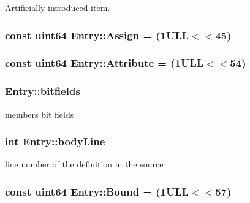 Artificially introduced item. 

\hypertarget{class_entry_a693e96b217885eef90ebcb231fbebf79}{}
\subsubsection[{Assign}]{\setlength{\rightskip}{0pt plus 5cm}const {\bf uint64} Entry\+::\+Assign = (1\+U\+L\+L$<$$<$45)\hspace{0.3cm}{\ttfamily [static]}}\label{class_entry_a693e96b217885eef90ebcb231fbebf79}
\hypertarget{class_entry_a58fb43e4c3a836419285bdcc29302a80}{}
\subsubsection[{Attribute}]{\setlength{\rightskip}{0pt plus 5cm}const {\bf uint64} Entry\+::\+Attribute = (1\+U\+L\+L$<$$<$54)\hspace{0.3cm}{\ttfamily [static]}}\label{class_entry_a58fb43e4c3a836419285bdcc29302a80}
\hypertarget{class_entry_a239e75c28fe009869cf25e681d2a2d41}{}
\subsubsection[{bitfields}]{ Entry\+::bitfields}\label{class_entry_a239e75c28fe009869cf25e681d2a2d41}


member\textquotesingle{}s bit fields 

\hypertarget{class_entry_a9a2b1e3404f4723d8a6bef5966146ed0}{}
\subsubsection[{body\+Line}]{\setlength{\rightskip}{0pt plus 5cm}int Entry\+::body\+Line}\label{class_entry_a9a2b1e3404f4723d8a6bef5966146ed0}


line number of the definition in the source 

\hypertarget{class_entry_a34a5de5a4672f4fbcfd879dffc577f58}{}
\subsubsection[{Bound}]{\setlength{\rightskip}{0pt plus 5cm}const {\bf uint64} Entry\+::\+Bound = (1\+U\+L\+L$<$$<$57)\hspace{0.3cm}{\ttfamily [static]}}\label{class_entry_a34a5de5a4672f4fbcfd879dffc577f58}
\hypertarget{class_entry_ad602ba19af5785515ed81790d843ce4c}{}
